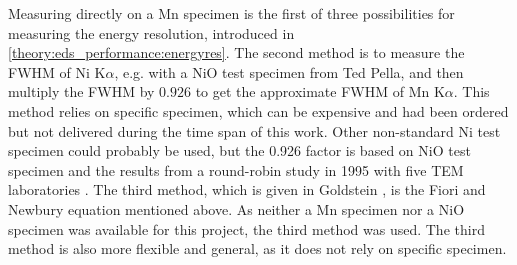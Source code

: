 Measuring directly on a Mn specimen is the first of three possibilities for measuring the energy resolution, introduced in \cref{theory:eds_performance:energyres}.
The second method is to measure the FWHM of Ni K$\alpha$, e.g. with a NiO test specimen from Ted Pella, and then multiply the FWHM by $0.926$ to get the approximate FWHM of Mn K$\alpha$.
This method relies on specific specimen, which can be expensive and had been ordered but not delivered during the time span of this work.
Other non-standard Ni test specimen could probably be used, but the 0.926 factor is based on NiO test specimen and the results from a round-robin study in 1995 with five TEM laboratories \cite{bennett_egerton_1995}.
The third method, which is given in Goldstein \cite{goldstein_scanning_2018}, is the Fiori and Newbury equation mentioned above.
As neither a Mn specimen nor a NiO specimen was available for this project, the third method was used.
The third method is also more flexible and general, as it does not rely on specific specimen.





